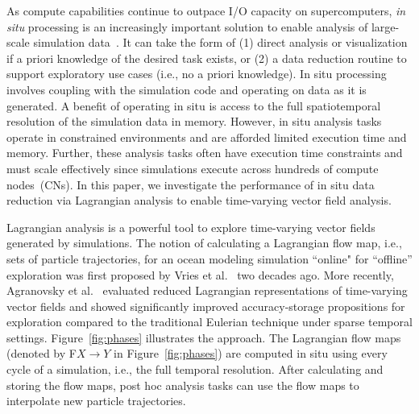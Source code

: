 As compute capabilities continue to outpace I/O capacity on supercomputers, \textit{in situ} processing is an increasingly important solution to enable analysis of large-scale simulation data~\cite{bauer2016situ}.
%
It can take the form of (1) direct analysis or visualization if a priori knowledge of the desired task exists, or (2) a data reduction routine to support exploratory use cases (i.e., no a priori knowledge). 
%
In situ processing involves coupling with the simulation code and operating on data as it is generated. 
%
A benefit of operating in situ is access to the full spatiotemporal resolution of the simulation data in memory.
%
However, in situ analysis tasks operate in constrained environments and are afforded limited execution time and memory.
%
Further, these analysis tasks often have execution time constraints and must scale effectively since simulations execute across hundreds of compute nodes~(CNs).
%
%
In this paper, we investigate the performance of in situ data reduction via Lagrangian analysis to enable time-varying vector field analysis.
%

Lagrangian analysis is a powerful tool to explore time-varying vector fields generated by simulations.
%
The notion of calculating a Lagrangian flow map, i.e., sets of particle trajectories, for an ocean modeling simulation ``online" for ``offline'' exploration was first proposed by Vries et al.~\cite{vries2001calculating} two decades ago.
%
More recently, Agranovsky et al.~\cite{agranovsky2014improved} evaluated reduced Lagrangian representations of time-varying vector fields and showed significantly improved accuracy-storage propositions for exploration compared to the traditional Eulerian technique under sparse temporal settings. 
%
Figure~\ref{fig:phases} illustrates the approach.
%
The Lagrangian flow maps (denoted by F$X$$\rightarrow$$Y$ in Figure~\ref{fig:phases}) are computed in situ using every cycle of a simulation, i.e., the full temporal resolution.
%
After calculating and storing the flow maps, post hoc analysis tasks can use the flow maps to interpolate new particle trajectories.
%
%



